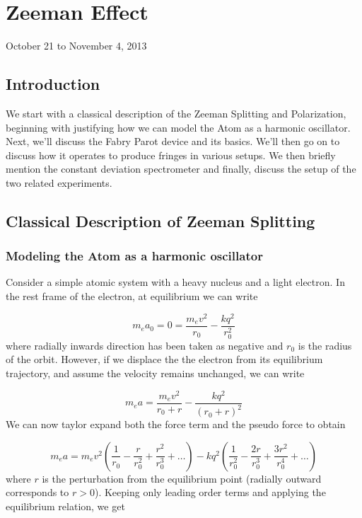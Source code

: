 \chapter{Zeeman Effect}
\begin{flushright}
October 21 to November 4, 2013 \\
\end{flushright}

\section{Introduction}

We start with a classical description of the Zeeman Splitting and
Polarization, beginning with justifying how we can model the Atom
as a harmonic oscillator. Next, we'll discuss the Fabry Parot device
and its basics. We'll then go on to discuss how it operates to produce
fringes in various setups. We then briefly mention the constant deviation
spectrometer and finally, discuss the setup of the two related experiments.


\section{Classical Description of Zeeman Splitting}


\subsection{Modeling the Atom as a harmonic oscillator}

Consider a simple atomic system with a heavy nucleus and a light electron.
In the rest frame of the electron, at equilibrium we can write

\[
m_{e}a_{0}=0=\frac{m_{e}v^{2}}{r_{0}}-\frac{kq^{2}}{r_{0}^{2}}
\]
where radially inwards direction has been taken as negative and $r_{0}$
is the radius of the orbit. However, if we displace the the electron
from its equilibrium trajectory, and assume the velocity remains unchanged,
we can write

\[
m_{e}a=\frac{m_{e}v^{2}}{r_{0}+r}-\frac{kq^{2}}{\left(r_{0}+r\right)^{2}}
\]
We can now taylor expand both the force term and the pseudo force
to obtain

\[
m_{e}a=m_{e}v^{2}\left(\frac{1}{r_{0}}-\frac{r}{r_{0}^{2}}+\frac{r^{2}}{r_{0}^{3}}+\ldots\right)-kq^{2}\left(\frac{1}{r_{0}^{2}}-\frac{2r}{r_{0}^{3}}+\frac{3r^{2}}{r_{0}^{4}}+\ldots\right)
\]
where $r$ is the perturbation from the equilibrium point (radially
outward corresponds to $r>0$). Keeping only leading order terms and
applying the equilibrium relation, we get


